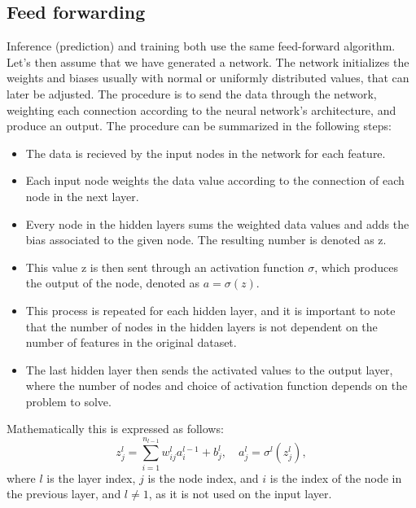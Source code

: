 \subsection*{Feed forwarding}
Inference (prediction) and training both use the same feed-forward algorithm. Let's then assume that we have generated a 
network. The network initializes the weights and biases usually with normal or uniformly distributed values, that can 
later be adjusted. The procedure is to send the data through the network, weighting each connection according to the neural network's 
architecture, and produce an output. The procedure can be summarized in the following steps\cite{FYSSTK}:
 \begin{itemize}
    \item The data is recieved by the input nodes in the network for each feature.
    \item Each input node weights the data value according to the connection of each node in the next layer.
    \item Every node in the hidden layers sums the weighted data values and adds the bias associated to the given node. The resulting number is denoted as z. 
    \item This value z is then sent through an activation function $\sigma$, which produces the output of the node, denoted as $a = \sigma(z)$.
    \item This process is repeated for each hidden layer, and it is important to note that the number of nodes in the hidden layers is not dependent on the number of features in the original dataset. 
    \item The last hidden layer then sends the activated values to the output layer, where the number of nodes and choice of activation function depends on the problem to solve.
 \end{itemize}

Mathematically this is expressed as follows:
\begin{equation}
    z_j^l = \sum_{i=1}^{n_{l-1}} w_{ij}^l a_i^{l-1} + b_j^l, \quad a_j^l = \sigma^l(z_j^l),
\end{equation}
where $l$ is the layer index, $j$ is the node index, and $i$ is the index of the node in the previous layer, 
and $l \neq 1$, as it is not used on the input layer.


